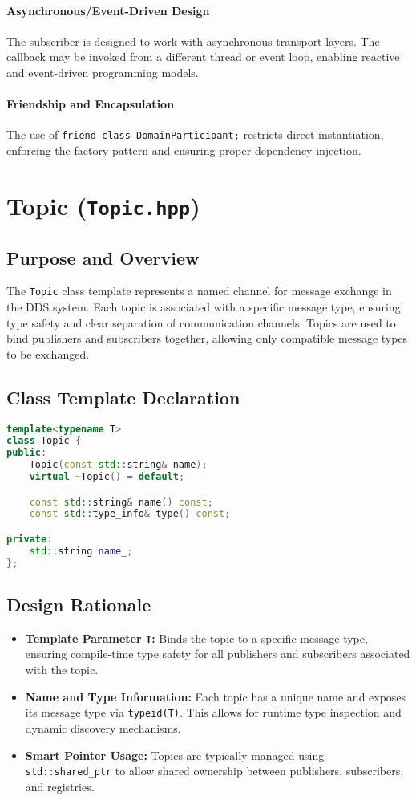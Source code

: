 \documentclass[12pt]{report}
\begin{document}
\paragraph{Asynchronous/Event-Driven Design}
The subscriber is designed to work with asynchronous transport layers. The callback may be invoked from a different thread or event loop, enabling reactive and event-driven programming models.

\paragraph{Friendship and Encapsulation}
The use of \texttt{friend class DomainParticipant;} restricts direct instantiation, enforcing the factory pattern and ensuring proper dependency injection.

\section{Topic (\texttt{Topic.hpp})}

\subsection{Purpose and Overview}
The \texttt{Topic} class template represents a named channel for message exchange in the DDS system. Each topic is associated with a specific message type, ensuring type safety and clear separation of communication channels. Topics are used to bind publishers and subscribers together, allowing only compatible message types to be exchanged.

\subsection{Class Template Declaration}
\begin{lstlisting}[language=C++]
template<typename T>
class Topic {
public:
    Topic(const std::string& name);
    virtual ~Topic() = default;

    const std::string& name() const;
    const std::type_info& type() const;

private:
    std::string name_;
};
\end{lstlisting}

\subsection{Design Rationale}
\begin{itemize}
    \item \textbf{Template Parameter \texttt{T}:} Binds the topic to a specific message type, ensuring compile-time type safety for all publishers and subscribers associated with the topic.
    \item \textbf{Name and Type Information:} Each topic has a unique name and exposes its message type via \texttt{typeid(T)}. This allows for runtime type inspection and dynamic discovery mechanisms.
    \item \textbf{Smart Pointer Usage:} Topics are typically managed using \texttt{std::shared\_ptr} to allow shared ownership between publishers, subscribers, and registries.
\end{itemize}
\end{document}
